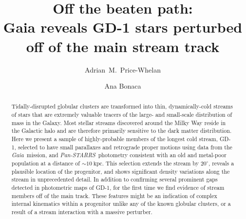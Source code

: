 \documentclass[modern]{aastex62}
\newcommand{\gaia}{\textsl{Gaia}}
\newcommand{\pans}{\textsl{Pan-STARRS}}
\newcommand{\kpc}{\textrm{kpc}}
\begin{document}
\sloppy\sloppypar\raggedbottom\frenchspacing %

\title{Off the beaten path: \\
       Gaia reveals GD-1 stars perturbed off of the main stream track}

\author[0000-0003-0872-7098]{Adrian~M.~Price-Whelan}

\author[0000-0002-7846-9787]{Ana Bonaca}

\begin{abstract}\noindent %
Tidally-disrupted globular clusters are transformed into thin, dynamically-cold
streams of stars that are extremely valuable tracers of the large- and
small-scale distribution of mass in the Galaxy.
Most stellar streams discovered around the Milky Way reside in the Galactic halo
and are therefore primarily sensitive to the dark matter distribution.
Here we present a sample of highly-probable members of the longest cold stream, GD-1, selected to have
small parallaxes and retrograde proper motions using data from the \gaia\
mission, and \pans\ photometry consistent with an old and metal-poor population
at a distance of $\sim10~\kpc$.
This selection extends the stream by $20^\circ$, reveals a plausible location of
the progenitor, and shows significant density variations along the stream in
unprecedented detail.
In addition to confirming several prominent gaps detected in photometric maps of GD-1, for the first time we find evidence
of stream members off of the main track.
These features might be an indication of complex internal kinematics within a progenitor unlike any of the known globular clusters, or a result of a stream interaction with a massive perturber.
\end{abstract}
\end{document}
